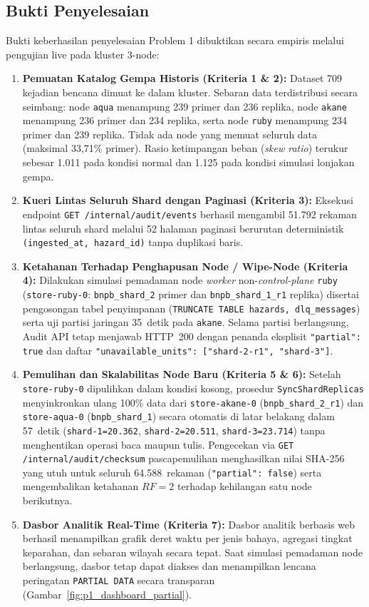 \vspace{1em}

\subsection{Bukti Penyelesaian}
Bukti keberhasilan penyelesaian Problem 1 dibuktikan secara empiris melalui pengujian live pada kluster 3-node:
\begin{enumerate}
    \item \textbf{Pemuatan Katalog Gempa Historis (Kriteria 1 \& 2):} Dataset 709 kejadian bencana dimuat ke dalam kluster. Sebaran data terdistribusi secara seimbang: node \texttt{aqua} menampung 239 primer dan 236 replika, node \texttt{akane} menampung 236 primer dan 234 replika, serta node \texttt{ruby} menampung 234 primer dan 239 replika. Tidak ada node yang memuat seluruh data (maksimal 33,71\% primer). Rasio ketimpangan beban (\textit{skew ratio}) terukur sebesar 1.011 pada kondisi normal dan 1.125 pada kondisi simulasi lonjakan gempa.
    \item \textbf{Kueri Lintas Seluruh Shard dengan Paginasi (Kriteria 3):} Eksekusi endpoint \texttt{GET /internal/audit/events} berhasil mengambil 51.792 rekaman lintas seluruh shard melalui 52 halaman paginasi berurutan deterministik \texttt{(ingested\_at, hazard\_id)} tanpa duplikasi baris.
    \item \textbf{Ketahanan Terhadap Penghapusan Node / Wipe-Node (Kriteria 4):} Dilakukan simulasi pemadaman node \textit{worker} non-\textit{control-plane} \texttt{ruby} (\texttt{store-ruby-0}: \texttt{bnpb\_shard\_2} primer dan \texttt{bnpb\_shard\_1\_r1} replika) disertai pengosongan tabel penyimpanan (\texttt{TRUNCATE TABLE hazards, dlq\_messages}) serta uji partisi jaringan 35~detik pada \texttt{akane}. Selama partisi berlangsung, Audit API tetap menjawab HTTP~200 dengan penanda eksplisit \texttt{"partial": true} dan daftar \texttt{"unavailable\_units": ["shard-2-r1", "shard-3"]}.
    \item \textbf{Pemulihan dan Skalabilitas Node Baru (Kriteria 5 \& 6):} Setelah \texttt{store-ruby-0} dipulihkan dalam kondisi kosong, prosedur \texttt{SyncShardReplicas} menyinkronkan ulang 100\% data dari \texttt{store-akane-0} (\texttt{bnpb\_shard\_2\_r1}) dan \texttt{store-aqua-0} (\texttt{bnpb\_shard\_1}) secara otomatis di latar belakang dalam 57~detik (\texttt{shard-1=20.362}, \texttt{shard-2=20.511}, \texttt{shard-3=23.714}) tanpa menghentikan operasi baca maupun tulis. Pengecekan via \texttt{GET /internal/audit/checksum} pascapemulihan menghasilkan nilai SHA-256 yang utuh untuk seluruh 64.588~rekaman (\texttt{"partial": false}) serta mengembalikan ketahanan $RF=2$ terhadap kehilangan satu node berikutnya.
    \item \textbf{Dasbor Analitik Real-Time (Kriteria 7):} Dasbor analitik berbasis web berhasil menampilkan grafik deret waktu per jenis bahaya, agregasi tingkat keparahan, dan sebaran wilayah secara tepat. Saat simulasi pemadaman node berlangsung, dasbor tetap dapat diakses dan menampilkan lencana peringatan \texttt{PARTIAL DATA} secara transparan (Gambar~\ref{fig:p1_dashboard_partial}).
\end{enumerate}

